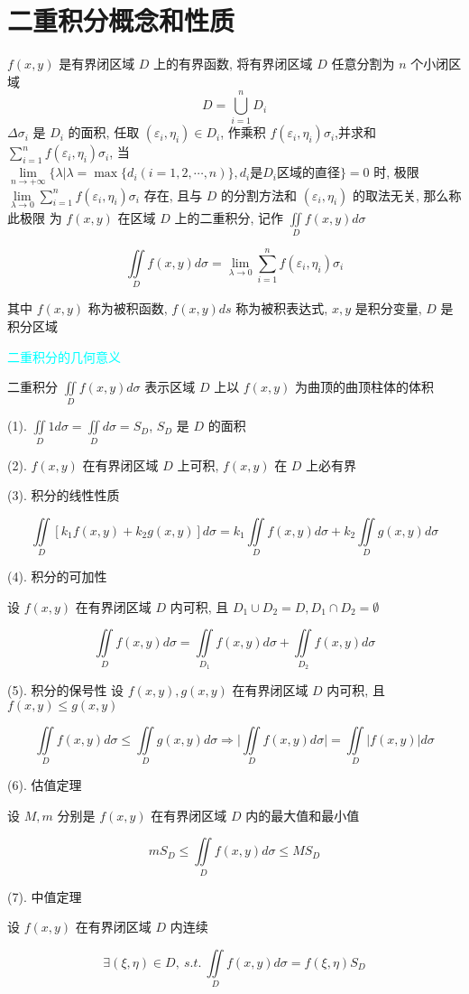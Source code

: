 \section{二重积分概念和性质}
\begin{definition}[二重积分]
	$f(x,y)$ 是有界闭区域 $D$ 上的有界函数,  将有界闭区域 $D$ 任意分割为 $n$ 个小闭区域
	$$D=\bigcup\limits_{i=1}^{n}D_{i}$$
	$\Delta \sigma_{i}$ 是 $D_{i}$ 的面积, 任取 $(\varepsilon_{i},\eta_{i})\in D_{i}$, 
	作乘积 $f(\varepsilon_{i},\eta_{i})\sigma_{i}$,并求和 $\sum\limits_{i=1}^{n}f(\varepsilon_{i},\eta_{i})\sigma_{i}$, 
	当 $\lim\limits_{n \to +\infty}\{\lambda |\lambda = \max\{d_{i}(i=1,2,\cdots,n)\}, d_{i}\text{是}D_{i}\text{区域的直径}\} = 0$ 时, 极限 $\lim\limits_{\lambda\to 0}\sum\limits_{i=1}^{n}
	f(\varepsilon_{i},\eta_{i})\sigma_{i}$ 存在, 且与 $D$ 的分割方法和 $(\varepsilon_{i},\eta_{i})$ 的取法无关, 那么称此极限
	为 $f(x,y)$ 在区域 $D$ 上的二重积分, 记作 $\iint\limits_{D}f(x,y)d\sigma$

	$$\iint\limits_{D} f(x,y) d\sigma = \lim\limits_{\lambda \to 0}\sum\limits_{i=1}^{n}f(\varepsilon_{i},\eta_{i})\sigma_{i}$$

	其中 $f(x,y)$ 称为被积函数, $f(x,y)ds$ 称为被积表达式, $x,y$ 是积分变量, $D$ 是积分区域

	\textcolor{cyan}{二重积分的几何意义} 
	
	二重积分 $\iint\limits_{D}f(x,y)d\sigma$ 表示区域 $D$ 上以 $f(x,y)$ 为曲顶的曲顶柱体的体积
\end{definition}
\begin{corollary}

	(1). $\iint\limits_{D}1d\sigma = \iint\limits_{D}d\sigma = S_{D}$, $S_{D}$ 是 $D$ 的面积

	(2). $f(x,y)$ 在有界闭区域 $D$ 上可积, $f(x,y)$ 在 $D$ 上必有界

	(3). 积分的线性性质

	$$\iint\limits_{D}\left[k_{1}f(x,y)+k_{2}g(x,y)\right]d\sigma = k_{1}\iint\limits_{D}f(x,y)d\sigma + k_{2}\iint\limits_{D}g(x,y)d\sigma$$

	(4). 积分的可加性

	设 $f(x,y)$ 在有界闭区域 $D$ 内可积, 且 $D_{1}\cup D_{2} = D, D_{1}\cap D_{2} = \emptyset$

	$$\iint\limits_{D}f(x,y)d\sigma = \iint\limits_{D_{1}}f(x,y)d\sigma + \iint\limits_{D_{2}}f(x,y)d\sigma$$

	(5). 积分的保号性
	设 $f(x,y),g(x,y)$ 在有界闭区域 $D$ 内可积, 且 $f(x,y)\leq g(x,y)$

	$$\iint\limits_{D}f(x,y)d\sigma\leq \iint\limits_{D}g(x,y)d\sigma \Rightarrow \big|\iint\limits_{D}f(x,y)d\sigma\big| = \iint\limits_{D}\big|f(x,y)\big|d\sigma$$

	(6). 估值定理

	设 $M,m$ 分别是 $f(x,y)$ 在有界闭区域 $D$ 内的最大值和最小值

	$$mS_{D} \leq \iint\limits_{D}f(x,y)d\sigma \leq M S_{D}$$

	(7). 中值定理

	设 $f(x,y)$ 在有界闭区域 $D$ 内连续

	$$\exists (\xi,\eta)\in D,\ s.t.\ \iint\limits_{D}f(x,y)d\sigma = f(\xi,\eta)S_{D}$$
\end{corollary}

